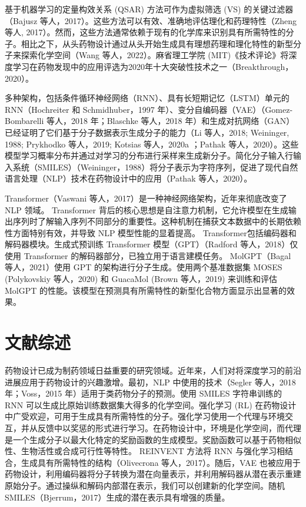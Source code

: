\begin{translation}
基于机器学习的定量构效关系 (QSAR) 方法可作为虚拟筛选 (VS) 的关键过滤器（Bajusz 等人，2017）。这些方法可以有效、准确地评估理化和药理特性（Zheng 等人, 2017）。然而，这些方法通常依赖于现有的化学库来识别具有所需特性的分子。相比之下，从头药物设计通过从头开始生成具有理想药理和理化特性的新型分子来探索化学空间（Wang 等人，2022）。麻省理工学院 (MIT)《技术评论》将深度学习在药物发现中的应用评选为2020年十大突破性技术之一（Breakthrough，2020）。

多种架构，包括条件循环神经网络（RNN）、具有长短期记忆（LSTM）单元的 RNN（Hochreiter 和 Schmidhuber，1997 年）、变分自编码器（VAE）（Gomez-Bombarelli 等人，2018 年；Blaschke 等人，2018 年）和生成对抗网络（GAN）已经证明了它们基于分子数据表示生成分子的能力（Li 等人，2018; Weininger, 1988; Prykhodko 等人，2019; Kotsias 等人，2020a ；Pathak 等人，2020）。这些模型学习概率分布并通过对学习的分布进行采样来生成新分子。简化分子输入行输入系统（SMILES）（Weininger，1988）将分子表示为字符序列，促进了现代自然语言处理（NLP）技术在药物设计中的应用（Pathak 等人，2020）。

Transformer（Vaswani 等人，2017）是一种神经网络架构，近年来彻底改变了 NLP 领域。 Transformer 背后的核心思想是自注意力机制，它允许模型在生成输出序列时了解输入序列不同部分的重要性。这种机制在捕获文本数据中的长期依赖性方面特别有效，并导致 NLP 模型性能的显着提高。 Transformer包括编码器和解码器模块。生成式预训练 Transformer 模型（GPT）（Radford 等人，2018）仅使用 Transformer 的解码器部分，已独立用于语言建模任务。 MolGPT（Bagal 等人，2021）使用 GPT 的架构进行分子生成。使用两个基准数据集 MOSES (Polykovskiy 等人，2020) 和 GuacaMol (Brown 等人，2019) 来训练和评估 MolGPT 的性能。该模型在预测具有所需特性的新型化合物方面显示出显著的效果。

\section{文献综述}

药物设计已成为制药领域日益重要的研究领域。近年来，人们对将深度学习的前沿进展应用于药物设计的兴趣激增。最初，NLP 中使用的技术（Segler 等人，2018 年；Voss，2015 年）适用于类药物分子的预测。使用 SMILES 字符串训练的 RNN 可以生成比原始训练数据集大得多的化学空间。强化学习 (RL) 在药物设计中广受欢迎，可用于生成具有所需特性的分子。强化学习使用一个代理与环境交互，并从反馈中以奖惩的形式进行学习。在药物设计中，环境是化学空间，而代理是一个生成分子以最大化特定的奖励函数的生成模型。奖励函数可以基于药物相似性、生物活性或合成可行性等特性。 REINVENT 方法将 RNN 与强化学习相结合，生成具有所需特性的结构（Olivecrona 等人，2017）。随后，VAE 也被应用于药物设计，利用编码器将分子转换为潜在向量表示，并利用解码器从潜在表示重建原始分子。通过操纵和解码内部潜在表示，我们可以创建新的化学空间。随机 SMILES（Bjerrum，2017）生成的潜在表示具有增强的质量。


\end{translation}

